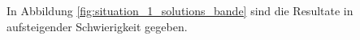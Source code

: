 In Abbildung \ref{fig:situation_1_solutions_bande} sind die Resultate in aufsteigender Schwierigkeit gegeben.

